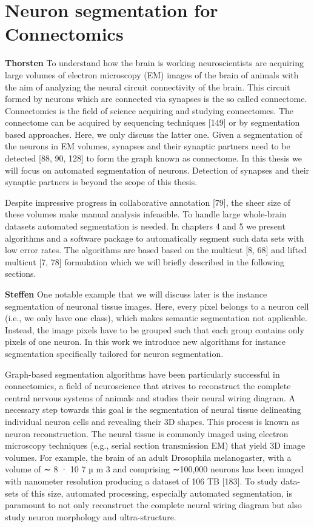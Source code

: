 \section{Neuron segmentation for Connectomics}
\textbf{Thorsten}
To understand how the brain is working neuroscientists are acquiring large volumes of electron microscopy (EM) images of the brain of animals with the aim of analyzing the neural circuit connectivity of the brain. This circuit formed by neurons which are connected via synapses is the so called connectome. Connectomics is the ﬁeld of science acquiring and studying connectomes. The connectome can be acquired by sequencing techniques [149] or by segmentation based approaches. Here, we only discuss the latter one. Given a segmentation of the neurons in EM volumes, synapses and their synaptic partners need to be detected [88, 90, 128] to form the graph known as connectome. In this thesis we will focus on automated segmentation of neurons. Detection of synapses and their synaptic partners is beyond the scope of this thesis.

Despite impressive progress in collaborative annotation [79], the sheer size of these volumes make manual analysis infeasible. To handle large whole-brain datasets automated segmentation is needed. In chapters 4 and 5 we present algorithms and a software package to automatically segment such data sets with low error rates. The algorithms are based based on the multicut [8, 68] and lifted multicut [7, 78] formulation which we will brieﬂy described in the following sections.

\textbf{Steffen}
One notable example that we will discuss later is the instance segmentation of neuronal tissue images. Here, every pixel belongs to a neuron cell (i.e., we only have one class), which makes semantic segmentation not applicable. Instead, the image pixels have to be grouped such that each group contains only pixels of one neuron. In this work we introduce new algorithms for instance segmentation speciﬁcally tailored for neuron segmentation.

Graph-based segmentation algorithms have been particularly successful in connectomics, a ﬁeld of neuroscience that strives to reconstruct the complete central nervous systems of animals and studies their neural wiring diagram. A necessary step towards this goal is the segmentation of neural tissue delineating individual neuron cells and revealing their 3D shapes. This process is known as neuron reconstruction. The neural tissue is commonly imaged using electron microscopy techniques (e.g., serial section transmission EM) that yield 3D image volumes. For example, the brain of an adult Drosophila melanogaster, with a volume of ∼ 8 · 10 7 µ m 3 and comprising ∼100,000 neurons has been imaged with nanometer resolution producing a dataset of 106 TB [183]. To study data-sets of this size, automated processing, especially automated segmentation, is paramount to not only reconstruct the complete neural wiring diagram but also study neuron morphology and ultra-structure.

